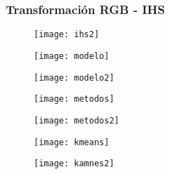 \documentclass[14pt]{beamer}
\begin{document}
\begin{frame}
\frametitle{Transformación RGB - IHS}
  \begin{figure}
    \centering
    \texttt{[image: ihs2]}
  \end{figure}
\tiny{}
\end{frame}
\begin{frame}
  \begin{figure}
    \centering
    \texttt{[image: modelo]}
  \end{figure}
\tiny{}
\end{frame}
\begin{frame}
  \begin{figure}
    \centering
    \texttt{[image: modelo2]}
  \end{figure}
\tiny{}
\end{frame}
\begin{frame}
  \begin{figure}
    \centering
    \texttt{[image: metodos]}
  \end{figure}
\tiny{}
\end{frame}
\begin{frame}
  \begin{figure}
    \centering
    \texttt{[image: metodos2]}
  \end{figure}
\tiny{}
\end{frame}
\begin{frame}
  \begin{figure}
    \centering
    \texttt{[image: kmeans]}
  \end{figure}
\tiny{}
\end{frame}
\begin{frame}
  \begin{figure}
    \centering
    \texttt{[image: kamnes2]}
  \end{figure}
\tiny{}
\end{frame}
\end{document}
